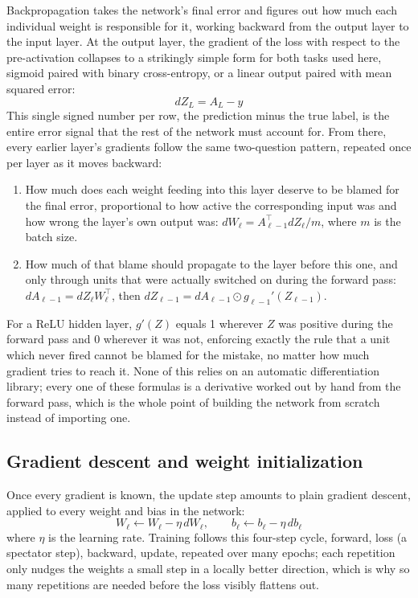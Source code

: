 \documentclass[11pt]{article}
\begin{document}
Backpropagation takes the network's final error and figures out how much each individual
weight is responsible for it, working backward from the output layer to the input layer.
At the output layer, the gradient of the loss with respect to the pre-activation collapses
to a strikingly simple form for both tasks used here, sigmoid paired with binary
cross-entropy, or a linear output paired with mean squared error:
\[
dZ_L = A_L - y
\]
This single signed number per row, the prediction minus the true label, is the entire error
signal that the rest of the network must account for. From there, every earlier layer's
gradients follow the same two-question pattern, repeated once per layer as it moves
backward:
\begin{enumerate}[nosep]
  \item How much does each weight feeding into this layer deserve to be blamed for the
    final error, proportional to how active the corresponding input was and how wrong the
    layer's own output was: $dW_\ell = A_{\ell-1}^{\top} dZ_\ell / m$, where $m$ is the
    batch size.
  \item How much of that blame should propagate to the layer before this one, and only
    through units that were actually switched on during the forward pass:
    $dA_{\ell-1} = dZ_\ell W_\ell^{\top}$, then $dZ_{\ell-1} = dA_{\ell-1} \odot
    g_{\ell-1}'(Z_{\ell-1})$.
\end{enumerate}
For a ReLU hidden layer, $g'(Z)$ equals 1 wherever $Z$ was positive during the forward pass
and 0 wherever it was not, enforcing exactly the rule that a unit which never fired cannot
be blamed for the mistake, no matter how much gradient tries to reach it. None of this
relies on an automatic differentiation library; every one of these formulas is a derivative
worked out by hand from the forward pass, which is the whole point of building the network
from scratch instead of importing one.

\subsection{Gradient descent and weight initialization}

Once every gradient is known, the update step amounts to plain gradient descent, applied to
every weight and bias in the network:
\[
W_\ell \leftarrow W_\ell - \eta \, dW_\ell, \qquad b_\ell \leftarrow b_\ell - \eta \, db_\ell
\]
where $\eta$ is the learning rate. Training follows this four-step cycle, forward, loss (a
spectator step), backward, update, repeated over many epochs; each repetition only nudges
the weights a small step in a locally better direction, which is why so many repetitions
are needed before the loss visibly flattens out.
\end{document}
